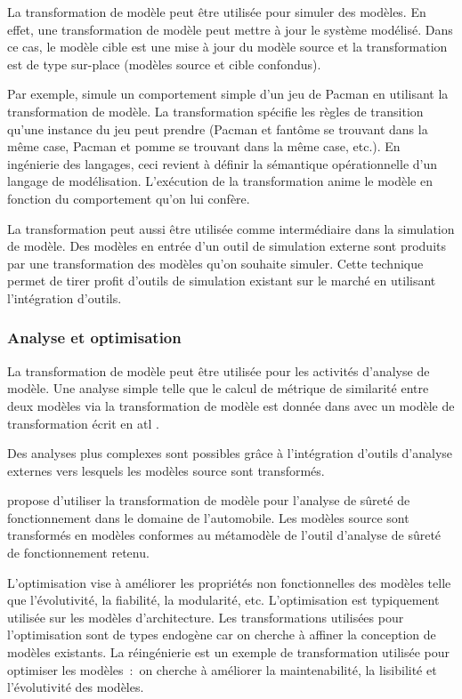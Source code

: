La transformation de modèle peut être utilisée pour simuler des modèles. En 
effet, une transformation de modèle peut mettre à jour le système modélisé. Dans 
ce cas, le modèle cible est une mise à jour du modèle source et la 
transformation est de type sur-place (modèles source et cible confondus). 

Par exemple, \cite{syriani2011multi} simule un comportement simple d'un jeu de 
Pacman en utilisant la transformation de modèle. La transformation spécifie les 
règles de transition qu'une instance du jeu peut prendre (Pacman et fantôme se 
trouvant dans la même case, Pacman et pomme se trouvant dans la même case, 
etc.). En ingénierie des langages, ceci revient à définir la sémantique 
opérationnelle d'un langage de modélisation. L'exécution de la transformation 
anime le modèle en fonction du comportement qu'on lui confère.

La transformation peut aussi être utilisée comme intermédiaire dans la 
simulation de modèle. Des modèles en entrée d'un outil de simulation externe 
sont produits par une transformation des modèles qu'on souhaite simuler. Cette 
technique permet de tirer profit d'outils de simulation existant sur le marché 
en utilisant l'intégration d'outils.

\subsubsection{Analyse et optimisation}

La transformation de modèle peut être utilisée pour les activités d'analyse de 
modèle. Une analyse simple telle que le calcul de métrique de similarité entre 
deux modèles via la transformation de modèle est donnée dans \cite{del2007semi} 
avec un modèle de transformation écrit en \gls{atl} \cite{jouault2006transforming}. 

Des analyses plus complexes sont possibles grâce à l'intégration d'outils 
d'analyse externes vers lesquels les modèles source sont transformés.

\cite{biehl2010integrating} propose d'utiliser la transformation de modèle pour 
l'analyse de sûreté de fonctionnement dans le domaine de l'automobile. Les 
modèles source sont transformés en modèles conformes au métamodèle de l'outil 
d'analyse de sûreté de fonctionnement retenu.
 
L'optimisation vise à améliorer les propriétés non fonctionnelles des modèles 
telle que l'évolutivité, la fiabilité, la modularité, etc. L'optimisation est 
typiquement utilisée sur les modèles d'architecture. Les transformations 
utilisées pour l'optimisation sont de types endogène car on cherche à affiner 
la conception de modèles existants. La réingénierie est un exemple de 
transformation utilisée pour optimiser les modèles~:~on cherche à améliorer la 
maintenabilité, la lisibilité et l'évolutivité des modèles.


